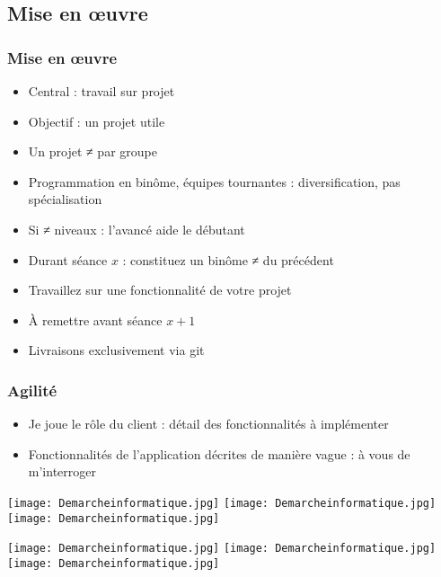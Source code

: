 \documentclass[english, french]{beamer}
\begin{document}
\subsection{Mise en œuvre}
\begin{frame}
	\frametitle{Mise en œuvre}
	\begin{itemize}
		\item Central : travail sur projet
		\item Objectif : un projet utile
		\item Un projet ≠ par groupe
		\item Programmation en binôme, équipes tournantes : diversification, pas spécialisation
		\item Si ≠ niveaux : l’avancé aide le débutant
		\item Durant séance $x$ : constituez un binôme ≠ du précédent
		\item Travaillez sur une fonctionnalité de votre projet
		\item À remettre avant séance $x + 1$
		\item Livraisons exclusivement via git
	\end{itemize}
\end{frame}

\begin{frame}
	\frametitle{Agilité}
	\begin{itemize}
		\item Je joue le rôle du client : détail des fonctionnalités à implémenter
		\item Fonctionnalités de l’application décrites de manière vague : à vous de m’interroger
	\end{itemize}
	\newlength{\agTotHeight}
	\newlength{\agTotWidth}
	\newlength{\agTopHalf}
	\setlength{\agTopHalf}{\agTotHeight / 2 + 1mm}
	\newlength{\agBottomHalf}
	\setlength{\agBottomHalf}{\agTotHeight / 2 + 1mm}
	\newlength{\agPanelWidth}
	\setlength{\agPanelWidth}{\agTotWidth / 3}
	\newlength{\agWidth}
	\setlength{\agWidth}{3.0cm - 1pt}
	\newlength{\agTopCrop}
	\setlength{\agTopCrop}{3mm}
	\newlength{\agBottomCrop}
	\setlength{\agBottomCrop}{6mm}
	\begin{center}
		\texttt{[image: Demarcheinformatique.jpg]}%
		\texttt{[image: Demarcheinformatique.jpg]}%
		\texttt{[image: Demarcheinformatique.jpg]}%
			
		\texttt{[image: Demarcheinformatique.jpg]}%
		\texttt{[image: Demarcheinformatique.jpg]}%
		\texttt{[image: Demarcheinformatique.jpg]}%
	\end{center}
\end{frame}
\end{document}

